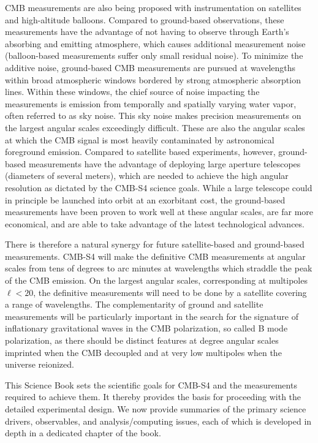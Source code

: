 CMB measurements are also being proposed with instrumentation on satellites and high-altitude balloons. Compared to ground-based observations, these measurements have the advantage of not having to observe through Earth's absorbing and emitting atmosphere, which causes additional measurement noise (balloon-based measurements suffer only small residual noise).  
To minimize the additive noise, ground-based CMB measurements are pursued at wavelengths within broad atmospheric windows bordered by strong atmospheric absorption lines. Within these windows, the chief source of noise impacting the measurements is emission from temporally and spatially varying water vapor, often referred to as sky noise. This sky noise makes precision measurements on the largest angular scales exceedingly difficult. These are also the angular scales at which the CMB signal is most heavily contaminated by astronomical foreground emission.
Compared to satellite based experiments, however, ground-based measurements have the advantage of deploying large aperture telescopes (diameters of several meters), which are needed to achieve the high angular resolution as dictated by the CMB-S4 science goals. While a large telescope could in principle be launched into orbit at an exorbitant cost, the ground-based measurements have been proven to work well at these angular scales,  are far more economical, and are able to take advantage of the latest technological advances.  

There is therefore a natural synergy for future satellite-based and ground-based measurements. CMB-S4 will make the definitive CMB measurements at angular scales from tens of degrees to arc minutes at wavelengths which straddle the peak of the CMB emission. On the largest angular scales, corresponding at multipoles $\ell < 20$, the definitive measurements will need to be done by a satellite covering a range of wavelengths.  The complementarity of ground and satellite measurements will be particularly important in the search for the signature of inflationary gravitational waves in the CMB polarization, so called B mode polarization, as there should be distinct features at degree angular scales imprinted when the CMB decoupled and at very low multipoles when the universe reionized. 

This Science Book sets the scientific goals for CMB-S4 and the measurements required to achieve them. It thereby provides the basis for proceeding with the detailed experimental design. We now provide summaries of the primary science drivers, observables, and analysis/computing issues, each of which is developed in depth in a dedicated chapter of the book.

